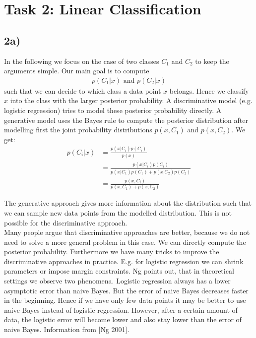 \section*{Task 2: Linear Classification}
\subsection*{2a)} 
In the following we focus on the case of two classes $C_1$ and $C_2$ to keep the arguments simple. Our main goal is to compute 
\begin{align*}
p(C_1 | x) \text{ and } p(C_2 | x)
\end{align*}
such that we can decide to which class a data point $x$ belongs. Hence we classify $x$ into the class with the larger posterior probability. A discriminative model (e.g. logistic regression) tries to model these posterior probability directly. A generative model uses the Bayes rule to compute the posterior distribution after modelling first the joint probability distributions $p(x, C_1)$ and $p(x, C_2)$. We get:
\begin{align}
p(C_i|x) &= \frac{p(x|C_i)p(C_i)}{p(x)}  \\
&= \frac{p(x|C_i)p(C_i)}{p(x|C_1)p(C_1) + p(x|C_2)p(C_2)} \\
& = \frac{p(x,C_i)}{p(x, C_1) + p(x, C_2)}
\end{align}

The generative approach gives more information about the distribution such that we can sample new data points from the modelled distribution. This is not possible for the discriminative approach. \\
Many people argue that discriminative approaches are better, because we do not need to solve a more general problem in this case. We can directly compute the posterior probability. Furthermore we have many tricks to improve the discriminative approaches in practice. E.g. for logistic regression we can shrink parameters or impose margin constraints. Ng points out, that in theoretical settings we observe two phenomena. Logistic regression always has a lower asymptotic error than naive Bayes. But the error of naive Bayes decreases faster in the beginning. Hence if we have only few data points it may be better to use naive Bayes instead of logistic regression. However, after a certain amount of data, the logistic error will become lower and also stay lower than the error of naive Bayes. 
Information from [Ng 2001].
